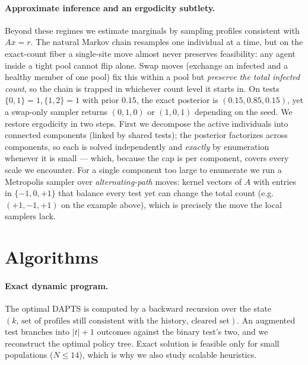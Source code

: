 \documentclass[11pt]{article}
\begin{document}
\paragraph{Approximate inference and an ergodicity subtlety.}
Beyond these regimes we estimate marginals by sampling profiles consistent with
$Ax=r$. The natural Markov chain resamples one individual at a time, but on the
exact-count fiber a single-site move almost never preserves feasibility: any
agent inside a tight pool cannot flip alone. Swap moves (exchange an infected and
a healthy member of one pool) fix this within a pool but \emph{preserve the total
infected count}, so the chain is trapped in whichever count level it starts in.
On tests $\{0,1\}{=}1,\{1,2\}{=}1$ with prior $0.15$, the exact posterior is
$(0.15,0.85,0.15)$, yet a swap-only sampler returns $(0,1,0)$ or $(1,0,1)$
depending on the seed. We restore ergodicity in two steps. First we decompose
the active individuals into connected components (linked by shared tests); the
posterior factorizes across components, so each is solved independently and
\emph{exactly} by enumeration whenever it is small --- which, because the cap is
per component, covers every scale we encounter. For a single component too large
to enumerate we run a Metropolis sampler over \emph{alternating-path} moves:
kernel vectors of $A$ with entries in $\{-1,0,+1\}$ that balance every test yet
can change the total count (e.g.\ $(+1,-1,+1)$ on the example above), which is
precisely the move the local samplers lack.

\section{Algorithms}
\paragraph{Exact dynamic program.}
The optimal DAPTS is computed by a backward recursion over the state
$(k,\,\text{set of profiles still consistent with the history},\,\text{cleared
set})$. An augmented test branches into $|t|+1$ outcomes against the binary test's
two, and we reconstruct the optimal policy tree. Exact solution is feasible only
for small populations ($N\le 14$), which is why we also study scalable
heuristics.
\end{document}
